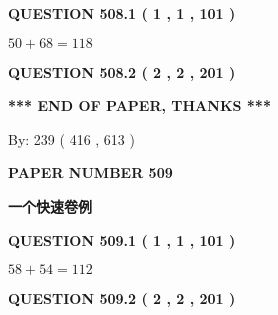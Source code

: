 \documentclass{ctexart}
\begin{document}
{\textbf{\Large{QUESTION
508.1 
 ( 1 , 1 , 101 )
}}}
  
  
 
 

$ %
50 +  %
68=   %
118$
 
 
  
\vspace{0.2in}
  
{\textbf{\Large{QUESTION
508.2 
 ( 2 , 2 , 201 )
}}}
  
  
   
   
 \vspace{0.2in}
 
   
   
   
   
\vspace{1.0in} 
{\textbf{\large{ *** END OF PAPER, THANKS *** }}} 
   
   
\hspace{1.0in} By: 
 239 ( 416 ,  613 )
   
   
   
   
\newpage 
\setcounter{page}{ 
   509001 } 
   
   
   
   
 {\textbf{ \Large{ PAPER NUMBER  509  }}}
   
   
\vspace{0.2in}
   
   
   
   
   
   
 \vspace{0.2in}
{\LARGE {\textbf{ 一个快速卷例}}}
   
   
  
\vspace{0.2in}
  
{\textbf{\Large{QUESTION
509.1 
 ( 1 , 1 , 101 )
}}}
  
  
 
 

$ %
58 +  %
54=   %
112$
 
 
  
\vspace{0.2in}
  
{\textbf{\Large{QUESTION
509.2 
 ( 2 , 2 , 201 )
}}}
  
  
   
   
 \vspace{0.2in}
 
   
   
\end{document}
